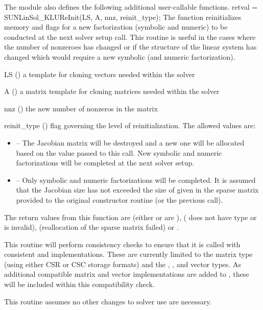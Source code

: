 The {\sunlinsolklu} module also defines the following additional
user-callable functions.
%
%
{
  retval = SUNLinSol\_KLUReInit(LS, A, nnz, reinit\_type);
}
{
  The function  reinitializes memory and
  flags for a new factorization (symbolic and numeric) to be conducted
  at the next solver setup call.  This routine is useful in the cases
  where the number of nonzeroes has changed or if the structure of the
  linear system has changed which would require a new symbolic (and
  numeric factorization).
}
{
  \begin{args}
  \item[LS] ()
    a template for cloning vectors needed within the solver
  \item[A] ()
    a {\sunmatsparse} matrix template for cloning matrices needed
    within the solver
  \item[nnz] ()
    the new number of nonzeros in the matrix
  \item[reinit\_type] ()
    flag governing the level of reinitialization.  The allowed values
    are:
    \begin{itemize}
    \item {} -- The Jacobian matrix will be
      destroyed and a new one will be allocated based on the 
      value passed to this call.  New symbolic and numeric
      factorizations will be completed at the next solver setup.
    \item {} -- Only symbolic and numeric
      factorizations will be completed.  It is assumed that the
      Jacobian size has not exceeded the size of  given in the
      sparse matrix provided to the original constructor routine (or
      the previous  call).
    \end{itemize}
  \end{args}
}
{
  The return values from this function are 
  (either  or  are ), 
  ( does not have type  or
   is invalid),  (reallocation
  of the sparse matrix failed) or .
}
{
  This routine will perform consistency checks to ensure that it is
  called with consistent {\nvector} and {\sunmatrix} implementations.
  These are currently limited to the {\sunmatsparse} matrix type
  (using either CSR or CSC storage formats) and the {\nvecs},
  {\nvecopenmp}, and {\nvecpthreads} vector types.  As additional
  compatible matrix and vector implementations are added to
  {\sundials}, these will be included within this compatibility
  check.

  This routine assumes no other changes to solver use are necessary.
}

